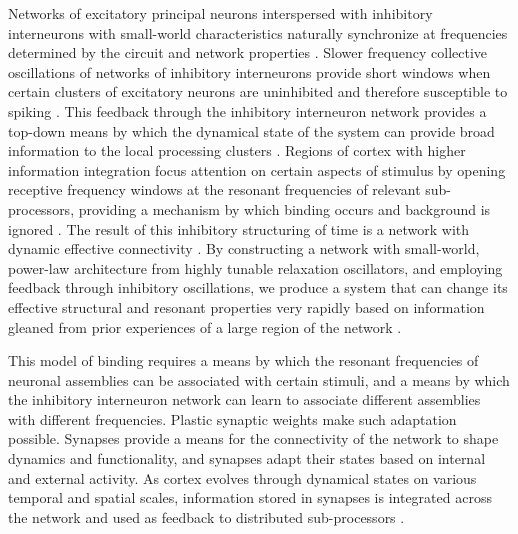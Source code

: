 \documentclass[aip,amsmath,amssymb,reprint,nofootinbib]{revtex4-1}
\begin{document}
Networks of excitatory principal neurons interspersed with inhibitory interneurons \cite{robu2015} with small-world characteristics naturally synchronize at frequencies determined by the circuit and network properties \cite{bu2006}. Slower frequency collective oscillations of networks of inhibitory interneurons provide short windows when certain clusters of excitatory neurons are uninhibited and therefore susceptible to spiking \cite{buge2004}. This feedback through the inhibitory interneuron network provides a top-down means by which the dynamical state of the system can provide broad information to the local processing clusters \cite{enfr2001,fr2015}. Regions of cortex with higher information integration focus attention \cite{vala2001} on certain aspects of stimulus by opening receptive frequency windows at the resonant frequencies of relevant sub-processors, providing a mechanism by which binding occurs and background is ignored \cite{lued1997,enfr2001,budr2004,fr2015}. The result of this inhibitory structuring of time is a network with dynamic effective connectivity \cite{brto2006,fr2015}. By constructing a network with small-world, power-law architecture from highly tunable relaxation oscillators, and employing feedback through inhibitory oscillations, we produce a system that can change its effective structural and resonant properties very rapidly based on information gleaned from prior experiences of a large region of the network \cite{budr2004,fr2015}.

This model of binding requires a means by which the resonant frequencies of neuronal assemblies can be associated with certain stimuli, and a means by which the inhibitory interneuron network can learn to associate different assemblies with different frequencies. Plastic synaptic weights make such adaptation possible. Synapses provide a means for the connectivity of the network to shape dynamics and functionality, and synapses adapt their states based on internal and external activity. As cortex evolves through dynamical states on various temporal and spatial scales, information stored in synapses is integrated across the network and used as feedback to distributed sub-processors \cite{enfr2001,fr2015}. 
\end{document}
